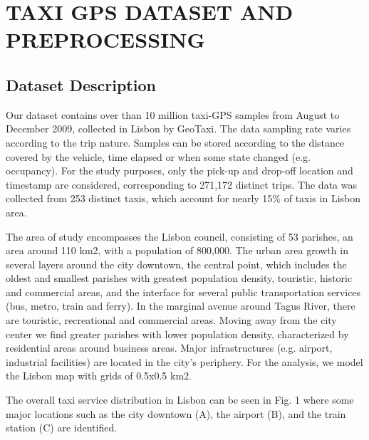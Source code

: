 \documentclass[a4paper, 10pt, conference]{ieeeconf}      %
\begin{document}
\section{TAXI GPS DATASET AND PREPROCESSING}%

\subsection{Dataset Description} 

Our dataset contains over than 10 million taxi-GPS samples from August to December 2009, collected in Lisbon by GeoTaxi. The data sampling rate varies according to the trip nature. Samples can be stored according to the distance covered by the vehicle, time elapsed or when some state changed (e.g. occupancy). For the study purposes, only the pick-up and drop-off location and timestamp are considered, corresponding to 271,172 distinct trips. The data was collected from 253 distinct taxis, which account for nearly 15\% of taxis in Lisbon area. 

The area of study encompasses the Lisbon council, consisting of 53 parishes, an area around 110 km2, with a population of 800,000. The urban area growth in several layers around the city downtown, the central point, which includes the oldest and smallest parishes with greatest population density, touristic, historic and commercial areas, and the interface for several public transportation services (bus, metro, train and ferry).  In the marginal avenue around Tagus River, there are touristic, recreational and commercial areas. Moving away from the city center we find greater parishes with lower population density, characterized by residential areas around business areas. Major infrastructures (e.g. airport, industrial facilities) are located in the city’s periphery. For the analysis, we model the Lisbon map with grids of 0.5x0.5 km2. 

The overall taxi service distribution in Lisbon can be seen in Fig. 1 where some major locations such as the city downtown (A), the airport (B), and the train station (C) are identified.  


\end{document}
